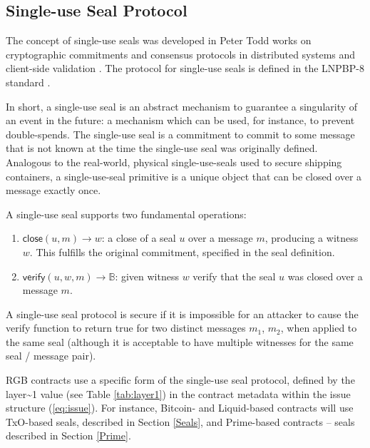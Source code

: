 \documentclass[9pt,oneside]{amsart}
\begin{document}
\begin{multicols}{2}


\subsection{Single-use Seal Protocol}\label{SUS}

The concept of single-use seals was developed in Peter Todd works on cryptographic commitments and
consensus protocols in distributed systems and client-side validation \cite{SUS1, SUS2, SUS3, SUS4}.
The protocol for single-use seals is defined in the LNPBP-8 standard \cite{LNPBP8}.

In short, a single-use seal is an abstract mechanism to guarantee
a singularity of an event in the future:
a mechanism which can be used, for instance, to prevent double-spends.
The single-use seal is a commitment to commit to some message that is not known
at the time the single-use seal was originally defined.
Analogous to the real-world, physical single-use-seals used to secure shipping containers,
a single-use-seal primitive is a unique object that can be closed over a message exactly once.

A single-use seal supports two fundamental operations:
\noindent
\begin{enumerate}
    \item $\mathsf{close}(u,m) \rightarrow w$: a close of a seal $u$ over a message $m$, producing a witness $w$.
    This fulfills the original commitment, specified in the seal definition.
    \item $\mathsf{verify}(u,w,m) \rightarrow \mathbb{B}$: 
    given witness $w$ verify that the seal $u$ was closed over a message $m$.
\end{enumerate}

A single-use seal protocol is secure if it is impossible for an attacker
to cause the \textsf{verify} function to return \textsf{true}
for two distinct messages $m_1$, $m_2$, when applied to the same seal
(although it is acceptable to have multiple witnesses for the same seal / message pair).

RGB contracts use a specific form of the single-use seal protocol,
defined by the \gls{layer~1} value (see Table \ref{tab:layer1})
in the contract metadata within the \gls{issue} structure (\ref{eq:issue}).
For instance, Bitcoin- and Liquid-based contracts will use TxO-based seals,
described in Section \ref{Seals}, and Prime-based contracts – seals described in Section \ref{Prime}.


\end{multicols}
\end{document}
